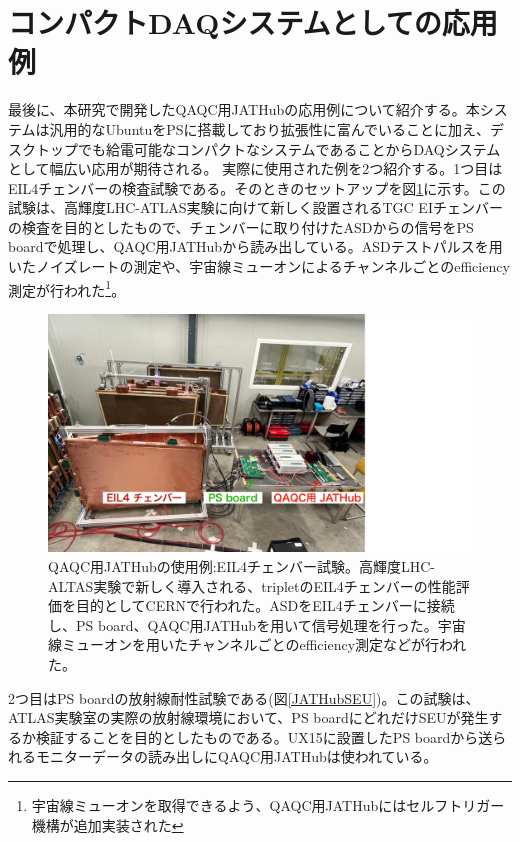 \section{コンパクトDAQシステムとしての応用例}
\label{sec_compactdaq}
最後に、本研究で開発したQAQC用JATHubの応用例について紹介する。本システムは汎用的なUbuntuをPSに搭載しており拡張性に富んでいることに加え、デスクトップでも給電可能なコンパクトなシステムであることからDAQシステムとして幅広い応用が期待される。
実際に使用された例を2つ紹介する。1つ目はEIL4チェンバーの検査試験である。そのときのセットアップを図\ref{JATHubEIL4}に示す。この試験は、高輝度LHC-ATLAS実験に向けて新しく設置されるTGC EIチェンバーの検査を目的としたもので、チェンバーに取り付けたASDからの信号をPS boardで処理し、QAQC用JATHubから読み出している。ASDテストパルスを用いたノイズレートの測定や、宇宙線ミューオンによるチャンネルごとのefficiency測定が行われた\footnote{宇宙線ミューオンを取得できるよう、QAQC用JATHubにはセルフトリガー機構が追加実装された}。
\baselineskip

\begin{figure}
\centering
\includegraphics[width=16cm]{fig/QAQC/JATHubEIL4.pdf}
\caption[QAQC用JATHubの使用例:EIL4チェンバー試験]{QAQC用JATHubの使用例:EIL4チェンバー試験\cite{mt_wada}。高輝度LHC-ALTAS実験で新しく導入される、tripletのEIL4チェンバーの性能評価を目的としてCERNで行われた。ASDをEIL4チェンバーに接続し、PS board、QAQC用JATHubを用いて信号処理を行った。宇宙線ミューオンを用いたチャンネルごとのefficiency測定などが行われた。}
\label{JATHubEIL4}
\end{figure}

2つ目はPS boardの放射線耐性試験である(図\ref{JATHubSEU})。この試験は、ATLAS実験室の実際の放射線環境において、PS boardにどれだけSEUが発生するか検証することを目的としたものである。UX15に設置したPS boardから送られるモニターデータの読み出しにQAQC用JATHubは使われている。

